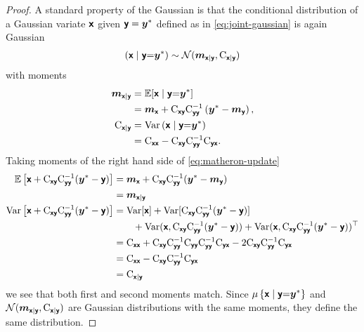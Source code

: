 \documentclass[wcp]{jmlr} %
\begin{document}
\begin{proof}
    A standard property of the Gaussian \citep[e.g.][]{Petersen2012Matrix} is that the conditional distribution of a Gaussian variate  $\vrv{x}$ given $\vrv{y} = \vv{y}^*$ defined as in \eqref{eq:joint-gaussian} is again Gaussian
    \begin{align}
        \left(\vrv{x} \gvn \vrv{y} {=} \vv{y}^*\right)
        \sim\Normal(\vv{m}_{\vrv{x}\gvn\vrv{y}}, \mm{C}_{\vrv{x}\gvn\vrv{y}})\label{eq:conditional-gaussian}
    \end{align}
    with moments
    \begin{align}
        \vv{m}_{\vrv{x}\gvn\vrv{y}}
            &=\Ex [\vrv{x} \gvn \vrv{y} {=} \vv{y}^*] \\
            &= \vv{m}_{\vrv{x}} + \mm{C}_{\vrv{xy}} \mm{C}_{\vrv{yy}}^{-1} \left( \vv{y}^* - \vv{m}_{\vrv{y}} \right), \label{eq:conditional-mean}\\
        \mm{C}_{\vrv{x}\gvn\vrv{y}}
            &= \var \left(\vrv{x} \gvn \vrv{y} {=} \vv{y}^*\right) \\
            &= \mm{C}_{\vrv{xx}} - \mm{C}_{\vrv{xy}} \mm{C}_{\vrv{yy}}^{-1} \mm{C}_{\vrv{yx}}. \label{eq:conditional-cov}
    \end{align}
Taking moments of the right hand side of \eqref{eq:matheron-update}
\begin{align}
\Ex\left[\vrv{x}+\mm{C}_{\vrv{xy}} \mm{C}_{\vrv{yy}}^{-1}(\vv{y}^*-\vrv{y})\right]
&=\vv{m}_{\vrv{x}} +\mm{C}_{\vrv{xy}}\mm{C}_{\vrv{yy}}^{-1}(\vv{y}^*-\vv{m}_{\vrv{y}})\\
&=\vv{m}_{\vrv{x}\gvn\vrv{y}}\\
\var\left[\vrv{x}+\mm{C}_{\vrv{xy}} \mm{C}_{\vrv{yy}}^{-1}(\vv{y}^*-\vrv{y})\right]
&=
    \var[\vrv{x}]+\var[\mm{C}_{\vrv{xy}} \mm{C}_{\vrv{yy}}^{-1}(\vv{y}^*-\vrv{y})] \\
    &\hspace{2em} +\var(\vrv{x},\mm{C}_{\vrv{xy}} \mm{C}_{\vrv{yy}}^{-1}(\vv{y}^*-\vrv{y}))
    +\var(\vrv{x},\mm{C}_{\vrv{xy}} \mm{C}_{\vrv{yy}}^{-1}(\vv{y}^*-\vrv{y}))^{\top}\\
&=\mm{C}_{\vrv{x}\vrv{x}} +\mm{C}_{\vrv{xy}} \mm{C}_{\vrv{yy}}^{-1}\mm{C}_{\vrv{yy}} \mm{C}_{\vrv{yy}}^{-1}\mm{C}_{\vrv{yx}}
-  2\mm{C}_{\vrv{xy}} \mm{C}_{\vrv{yy}}^{-1}\mm{C}_{\vrv{yx}}\\
&=\mm{C}_{\vrv{x}\vrv{x}} -\mm{C}_{\vrv{xy}} \mm{C}_{\vrv{yy}}^{-1}\mm{C}_{\vrv{yx}}\\
&=\mm{C}_{\vrv{x}\gvn\vrv{y}}
\end{align}
we see that both first and second moments match.
Since $\Law\left\{\vrv{x} \gvn \vrv{y} {=} \vv{y}^*\right\}$ and
$\Normal(\vv{m}_{\vrv{x}\gvn\vrv{y}}, \mm{C}_{\vrv{x}\gvn\vrv{y}})$ are Gaussian distributions with the same moments, they define the same distribution.
\end{proof}
\end{document}
